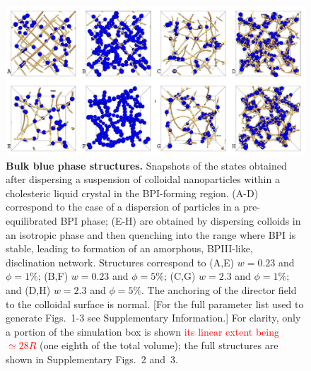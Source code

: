 \documentclass[12pt]{article}
\begin{document}
\begin{figure}

\centerline{\includegraphics[width=\textwidth]{text-fig1.jpg}}
\caption{\textbf{Bulk blue phase structures.} Snapshots of the states
obtained after dispersing
a suspension of colloidal nanoparticles within a cholesteric liquid
crystal in the BPI-forming region. (A-D) correspond to the case
of a dispersion of particles in a pre-equilibrated BPI phase;
(E-H) are obtained by dispersing colloids in an isotropic
phase and then quenching into the range where BPI is stable, leading to formation of an amorphous, BPIII-like, disclination network.
Structures correspond
to (A,E) $w=0.23$ and $\phi=1\%$;
(B,F) $w=0.23$ and $\phi=5\%$; 
(C,G) $w=2.3$ and $\phi=1\%$; and
(D,H) $w=2.3$ and $\phi=5\%$.
The anchoring of the director field to the colloidal surface is normal.
[For the full parameter list used to generate Figs.~1-3 see Supplementary
Information.] For clarity, only a portion of the simulation box is shown
\textcolor{red}{its linear extent being $\simeq 28R$}
(one eighth of the total volume);
the full structures are shown in
Supplementary Figs.~2 and~3.}
\end{figure}
\end{document}
